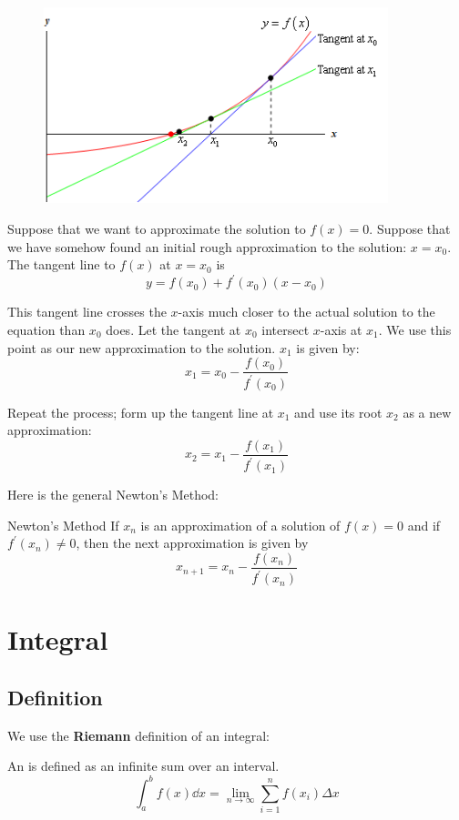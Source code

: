 \begin{figure}[H]
    \centering
    \includegraphics[width=10cm]{images/newton_method.png}
\end{figure}

Suppose that we want to approximate the solution to $f(x)=0$. Suppose that we have somehow found an initial rough approximation to the solution: $x=x_0$. The tangent line to $f(x)$ at $x=x_0$ is
\[ y = f(x_0) + f^\prime(x_0)(x-x_0) \]

This tangent line crosses the $x$-axis much closer to the actual solution to the equation than $x_0$ does. Let the tangent at $x_0$ intersect $x$-axis at $x_1$. We use this point as our new approximation to the solution. $x_1$ is given by:
\[ x_1 = x_0 - \frac{f(x_0)}{f^\prime(x_0)} \]

Repeat the process; form up the tangent line at $x_1$ and use its root $x_2$ as a new approximation:
\[ x_2 = x_1 - \frac{f(x_1)}{f^\prime(x_1)} \]

Here is the general Newton's Method:
\begin{thrm}{Newton's Method}{}
If $x_n$ is an approximation of a solution of $f(x)=0$ and if $f^\prime(x_n) \neq 0$, then the next approximation is given by
\[ x_{n+1} = x_n - \frac{f(x_n)}{f^\prime(x_n)} \]
\end{thrm}
\pagebreak

\chapter{Integral}
\section{Definition}
We use the \textbf{Riemann} definition of an integral:
\begin{definition}
An  is defined as an infinite sum over an interval.
\begin{equation}
\int_a^b f(x) \dd{x} = \lim_{n \to \infty} \sum_{i=1}^n f(x_i) \Delta x
\end{equation}
\end{definition}

